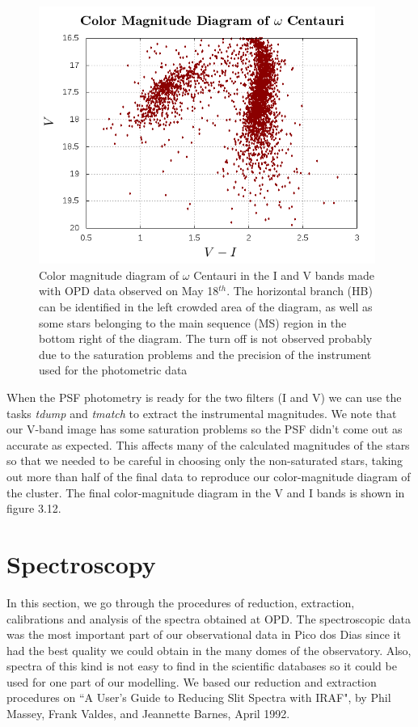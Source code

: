 \begin{figure}[]
\centering
\includegraphics[width=11cm]{images/HR-diagram.png}
\caption[Color magnitude diagram of Omega Centauri with our photometric data]{Color magnitude diagram of $\omega$ Centauri in the I and V bands made with OPD data observed on May 18$^{th}$. The horizontal branch (HB) can be identified in the left crowded area of the diagram, as well as some stars belonging to the main sequence (MS)  region in the bottom right of the diagram. The turn off is not observed probably due to the saturation problems and the precision of the instrument used for the photometric data}
\end{figure}

When the PSF photometry is ready for the two filters (I and V) we can use the tasks \textit{tdump} and \textit{tmatch} to extract the instrumental magnitudes. We note that our V-band image has some saturation problems so the PSF didn't come out as accurate as expected. This affects many of the calculated magnitudes of the stars so that we needed to be careful in choosing only the non-saturated stars, taking out more than half of the final data to reproduce our color-magnitude diagram of the cluster. The final color-magnitude diagram in the V and I bands is shown in figure 3.12.

\section{Spectroscopy}

In this section, we go through the procedures of reduction, extraction, calibrations and analysis of the spectra obtained at OPD. The spectroscopic data was the most important part of our observational data in Pico dos Dias since it had the best quality we could obtain in the many domes of the observatory. Also, spectra of this kind is not easy to find in the scientific databases so it could be used for one part of our modelling. We based our reduction and extraction procedures on ``A User's Guide to Reducing Slit Spectra with IRAF", by Phil Massey, Frank Valdes, and Jeannette Barnes, April 1992. 

